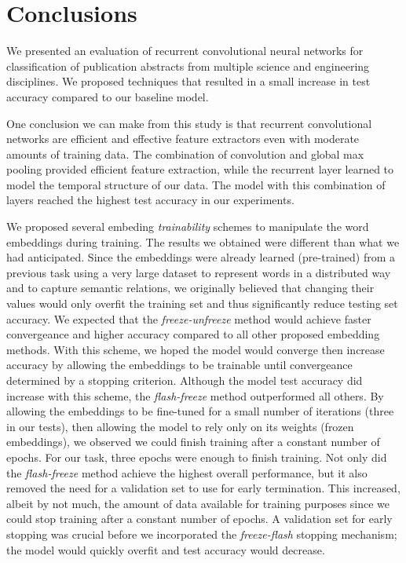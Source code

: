 
\chapter{Conclusions}
We presented an evaluation of recurrent convolutional neural networks for classification of publication abstracts from multiple science and
engineering disciplines. We proposed techniques that resulted in a small increase in test accuracy compared to our baseline model.

One conclusion we can make from this study is that recurrent convolutional networks are efficient and effective feature extractors even with
moderate amounts of training data. The combination of convolution and global max pooling provided efficient feature extraction, while the recurrent layer
learned to model the temporal structure of our data. The model with this combination of layers reached the highest test accuracy in our experiments.

We proposed several embeding \textit{trainability} schemes to manipulate the word embeddings during training.
The results we obtained were different than what we had anticipated. Since the embeddings were already learned (pre-trained) from a previous task
using a very large dataset to represent words in a distributed way and to capture semantic relations,
we originally believed that changing their values would only overfit the training set and thus significantly reduce testing set accuracy.
We expected that the \textit{freeze-unfreeze} method would achieve faster convergeance and higher accuracy compared to all other proposed embedding methods.
With this scheme, we hoped the model would converge then increase accuracy by allowing the embeddings to be trainable until convergeance determined by
a stopping criterion. Although the model test accuracy did increase with this scheme, the \textit{flash-freeze} method outperformed all others.
By allowing the embeddings to be fine-tuned for a small number of iterations (three in our tests), then allowing the model to rely
only on its weights (frozen embeddings), we observed we could finish training after a constant number of epochs.
For our task, three epochs were enough to finish training. Not only did the \textit{flash-freeze} method achieve the highest overall performance, but it also
removed the need for a validation set to use for early termination.
This increased, albeit by not much, the amount of data available for training purposes since we could stop training after a constant number of epochs.
A validation set for early stopping was crucial before we incorporated the \textit{freeze-flash} stopping mechanism; the model would quickly overfit and test accuracy
would decrease.

